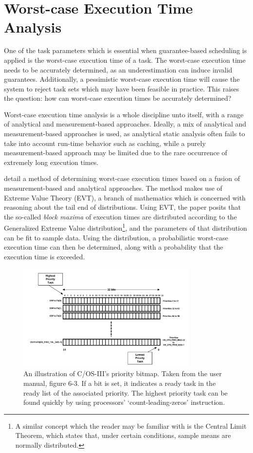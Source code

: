 \documentclass[twoside]{uva-inf-bachelor-thesis}
\newcommand{\ucosiii}{\textmu C/OS-III\xspace}
\begin{document}
\section{Worst-case Execution Time Analysis}
One of the task parameters which is essential when guarantee-based scheduling is applied is the worst-case execution time of a task. The worst-case execution time needs to be accurately determined, as an underestimation can induce invalid guarantees. Additionally, a pessimistic worst-case execution time will cause the system to reject task sets which may have been feasible in practice. This raises the question: how can worst-case execution times be accurately determined?

Worst-case execution time analysis is a whole discipline unto itself, with a range of analytical and measurement-based approaches. Ideally, a mix of analytical and measurement-based approaches is used, as analytical static analysis often fails to take into account run-time behavior such as caching, while a purely measurement-based approach may be limited due to the rare occurrence of extremely long execution times.

\textcite{hansen_et_al:wcet} detail a method of determining worst-case execution times based on a fusion of measurement-based and analytical approaches. The method makes use of Extreme Value Theory (EVT), a branch of mathematics which is concerned with reasoning about the tail end of distributions. Using EVT, the paper posits that the so-called \emph{block maxima} of execution times are distributed according to the Generalized Extreme Value distribution\footnote{A similar concept which the reader may be familiar with is the Central Limit Theorem, which states that, under certain conditions, sample means are normally distributed.}, and the parameters of that distribution can be fit to sample data. Using the distribution, a probabilistic worst-case execution time can then be determined, along with a probability that the execution time is exceeded.

\begin{figure}[htpb]
    \centering
    \includegraphics[width=0.8\textwidth]{priobitmap.png}
    \caption{An illustration of \ucosiii's priority bitmap. Taken from the user manual, figure 6-3. If a bit is set, it indicates a ready task in the ready list of the associated priority. The highest priority task can be found quickly by using processors' `count-leading-zeros' instruction.}
    \label{fig:priobitmap}
\end{figure}
\end{document}
